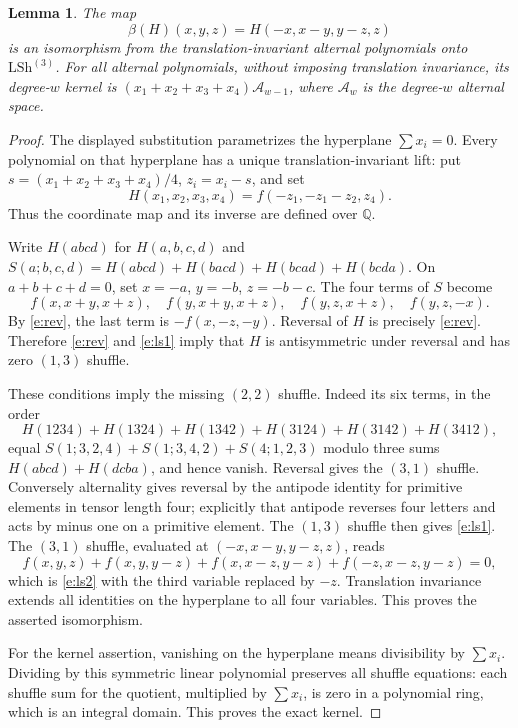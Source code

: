 \documentclass[12pt]{amsart}
\newtheorem{lem}[thm]{Lemma}
\theoremstyle{definition}
\theoremstyle{remark}
\numberwithin{equation}{section}
\newcommand{\Q}{\mathbb{Q}}
\newcommand{\LS}{\mathrm{LSh}}
\newcommand{\Al}{\mathcal A}
\numberwithin{equation}{section}
\begin{document}
\begin{lem}\label{e:coordinate}
The map
\begin{equation}\label{e:beta}
 \beta(H)(x,y,z)=H(-x,x-y,y-z,z)
\end{equation}
is an isomorphism from the translation-invariant alternal polynomials onto
$\LS^{(3)}$. For all alternal polynomials, without imposing translation
invariance, its degree-$w$ kernel is
$(x_1+x_2+x_3+x_4)\Al_{w-1}$, where $\Al_w$ is the degree-$w$ alternal space.
\end{lem}
\begin{proof}
The displayed substitution parametrizes the hyperplane $\sum x_i=0$.
Every polynomial on that hyperplane has a unique translation-invariant lift:
put $s=(x_1+x_2+x_3+x_4)/4$, $z_i=x_i-s$, and set
\[
 H(x_1,x_2,x_3,x_4)=f(-z_1,-z_1-z_2,z_4).
\]
Thus the coordinate map and its inverse are defined over $\Q$.

Write $H(abcd)$ for $H(a,b,c,d)$ and
$S(a;b,c,d)=H(abcd)+H(bacd)+H(bcad)+H(bcda)$.
On $a+b+c+d=0$, set $x=-a$, $y=-b$, $z=-b-c$.
The four terms of $S$ become
\[
 f(x,x+y,x+z),\quad f(y,x+y,x+z),\quad
 f(y,z,x+z),\quad f(y,z,-x).
\]
By \eqref{e:rev}, the last term is $-f(x,-z,-y)$.
Reversal of $H$ is precisely \eqref{e:rev}.
Therefore \eqref{e:rev} and \eqref{e:ls1} imply that $H$ is
antisymmetric under reversal and has zero $(1,3)$ shuffle.

These conditions imply the missing $(2,2)$ shuffle. Indeed its six terms,
in the order
\[
 H(1234)+H(1324)+H(1342)+H(3124)+H(3142)+H(3412),
\]
equal $S(1;3,2,4)+S(1;3,4,2)+S(4;1,2,3)$ modulo three sums
$H(abcd)+H(dcba)$, and hence vanish. Reversal gives the $(3,1)$ shuffle.
Conversely alternality gives reversal by the antipode identity for primitive
elements in tensor length four; explicitly that antipode reverses four
letters and acts by minus one on a primitive element. The $(1,3)$ shuffle
then gives \eqref{e:ls1}. The $(3,1)$ shuffle, evaluated at
$(-x,x-y,y-z,z)$, reads
\[
 f(x,y,z)+f(x,y,y-z)+f(x,x-z,y-z)+f(-z,x-z,y-z)=0,
\]
which is \eqref{e:ls2} with the third variable replaced by $-z$.
Translation invariance extends all identities on the hyperplane to all
four variables. This proves the asserted isomorphism.

For the kernel assertion, vanishing on the hyperplane means divisibility
by $\sum x_i$. Dividing by this symmetric linear polynomial preserves all
shuffle equations: each shuffle sum for the quotient, multiplied by
$\sum x_i$, is zero in a polynomial ring, which is an integral domain.
This proves the exact kernel.
\end{proof}
\end{document}
